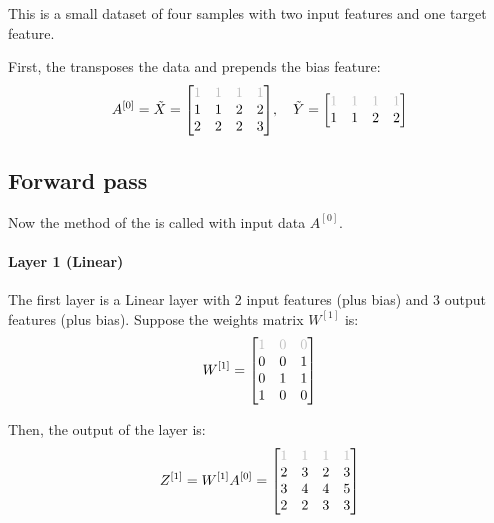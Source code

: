 This is a small dataset of four samples with two input features and one target feature.

First, the  transposes the data and prepends the bias feature:
\begin{equation*}
    A^{[0]} = \tilde{X} = \mqty[
        \color{lightgray} 1 & \color{lightgray} 1 & \color{lightgray} 1 & \color{lightgray} 1 \\
        1 & 1 & 2 & 2 \\
        2 & 2 & 2 & 3
    ], \quad \tilde{Y} = \mqty[
        \color{lightgray} 1 & \color{lightgray} 1 & \color{lightgray} 1 & \color{lightgray} 1 \\
        1 & 1 & 2 & 2
    ]
\end{equation*}

\newpage
\subsection{Forward pass}
Now the  method of the  is called with input data $A^{[0]}$.

\paragraph{Layer 1 (Linear)} The first layer is a Linear layer with 2 input features (plus bias) and 3 output features (plus bias). Suppose the weights matrix $W^{[1]}$ is:
\begin{equation*}
    W^{[1]} = \mqty[
        \color{lightgray} 1 & \color{lightgray} 0 & \color{lightgray} 0 \\
        0 & 0 & 1 \\
        0 & 1 & 1 \\
        1 & 0 & 0
    ]
\end{equation*}

Then, the output of the layer is:
\begin{equation*}
    Z^{[1]} = W^{[1]} A^{[0]} = \mqty[
        \color{lightgray} 1 & \color{lightgray} 1 & \color{lightgray} 1 & \color{lightgray} 1 \\
        2 & 3 & 2 & 3 \\
        3 & 4 & 4 & 5 \\
        2 & 2 & 3 & 3
    ]
\end{equation*}

